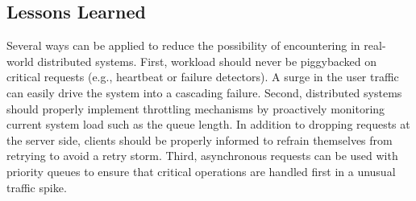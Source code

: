 \subsection{Lessons Learned}

Several ways can be applied to reduce the possibility of encountering \vcs in real-world distributed systems. First, workload should never be piggybacked on critical requests (e.g., heartbeat or failure detectors). A surge in the user traffic can easily drive the system into a cascading failure. Second, distributed systems should properly implement throttling mechanisms by proactively monitoring current system load such as the queue length. In addition to dropping requests at the server side, clients should be properly informed to refrain themselves from retrying to avoid a retry storm. Third, asynchronous requests can be used with priority queues to ensure that critical operations are handled first in a unusual traffic spike.
